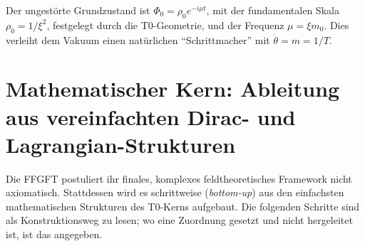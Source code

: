 	Der ungestörte Grundzustand ist $\Phi_0 = \rho_0 e^{-i\mu t}$, mit der fundamentalen Skala $\rho_0 = 1/\xi^2$, festgelegt durch die T0-Geometrie, und der Frequenz $\mu = \xi m_0$. Dies verleiht dem Vakuum einen natürlichen ``Schrittmacher'' mit $\dot{\theta} = m = 1/T$.
	
	\section{Mathematischer Kern: Ableitung aus vereinfachten Dirac- und Lagrangian-Strukturen}
	
	Die FFGFT postuliert ihr finales, komplexes feldtheoretisches Framework nicht axiomatisch. Stattdessen wird es schrittweise (\emph{bottom-up}) aus den einfachsten mathematischen Strukturen des T0-Kerns aufgebaut. Die folgenden Schritte sind als Konstruktionsweg zu lesen; wo eine Zuordnung gesetzt und nicht hergeleitet ist, ist das angegeben.
	
